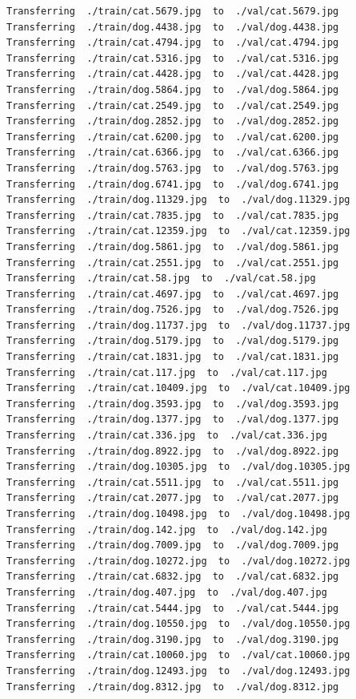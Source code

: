 \documentclass[]{book}
\theoremstyle{definition}
\theoremstyle{definition}
\theoremstyle{definition}
\theoremstyle{remark}
\begin{document}
\begin{verbatim}
Transferring  ./train/cat.5679.jpg  to  ./val/cat.5679.jpg
Transferring  ./train/dog.4438.jpg  to  ./val/dog.4438.jpg
Transferring  ./train/cat.4794.jpg  to  ./val/cat.4794.jpg
Transferring  ./train/cat.5316.jpg  to  ./val/cat.5316.jpg
Transferring  ./train/cat.4428.jpg  to  ./val/cat.4428.jpg
Transferring  ./train/dog.5864.jpg  to  ./val/dog.5864.jpg
Transferring  ./train/cat.2549.jpg  to  ./val/cat.2549.jpg
Transferring  ./train/dog.2852.jpg  to  ./val/dog.2852.jpg
Transferring  ./train/cat.6200.jpg  to  ./val/cat.6200.jpg
Transferring  ./train/cat.6366.jpg  to  ./val/cat.6366.jpg
Transferring  ./train/dog.5763.jpg  to  ./val/dog.5763.jpg
Transferring  ./train/dog.6741.jpg  to  ./val/dog.6741.jpg
Transferring  ./train/dog.11329.jpg  to  ./val/dog.11329.jpg
Transferring  ./train/cat.7835.jpg  to  ./val/cat.7835.jpg
Transferring  ./train/cat.12359.jpg  to  ./val/cat.12359.jpg
Transferring  ./train/dog.5861.jpg  to  ./val/dog.5861.jpg
Transferring  ./train/cat.2551.jpg  to  ./val/cat.2551.jpg
Transferring  ./train/cat.58.jpg  to  ./val/cat.58.jpg
Transferring  ./train/cat.4697.jpg  to  ./val/cat.4697.jpg
Transferring  ./train/dog.7526.jpg  to  ./val/dog.7526.jpg
Transferring  ./train/dog.11737.jpg  to  ./val/dog.11737.jpg
Transferring  ./train/dog.5179.jpg  to  ./val/dog.5179.jpg
Transferring  ./train/cat.1831.jpg  to  ./val/cat.1831.jpg
Transferring  ./train/cat.117.jpg  to  ./val/cat.117.jpg
Transferring  ./train/cat.10409.jpg  to  ./val/cat.10409.jpg
Transferring  ./train/dog.3593.jpg  to  ./val/dog.3593.jpg
Transferring  ./train/dog.1377.jpg  to  ./val/dog.1377.jpg
Transferring  ./train/cat.336.jpg  to  ./val/cat.336.jpg
Transferring  ./train/dog.8922.jpg  to  ./val/dog.8922.jpg
Transferring  ./train/dog.10305.jpg  to  ./val/dog.10305.jpg
Transferring  ./train/cat.5511.jpg  to  ./val/cat.5511.jpg
Transferring  ./train/cat.2077.jpg  to  ./val/cat.2077.jpg
Transferring  ./train/dog.10498.jpg  to  ./val/dog.10498.jpg
Transferring  ./train/dog.142.jpg  to  ./val/dog.142.jpg
Transferring  ./train/dog.7009.jpg  to  ./val/dog.7009.jpg
Transferring  ./train/dog.10272.jpg  to  ./val/dog.10272.jpg
Transferring  ./train/cat.6832.jpg  to  ./val/cat.6832.jpg
Transferring  ./train/dog.407.jpg  to  ./val/dog.407.jpg
Transferring  ./train/cat.5444.jpg  to  ./val/cat.5444.jpg
Transferring  ./train/dog.10550.jpg  to  ./val/dog.10550.jpg
Transferring  ./train/dog.3190.jpg  to  ./val/dog.3190.jpg
Transferring  ./train/cat.10060.jpg  to  ./val/cat.10060.jpg
Transferring  ./train/dog.12493.jpg  to  ./val/dog.12493.jpg
Transferring  ./train/dog.8312.jpg  to  ./val/dog.8312.jpg

\end{verbatim}
\end{document}
